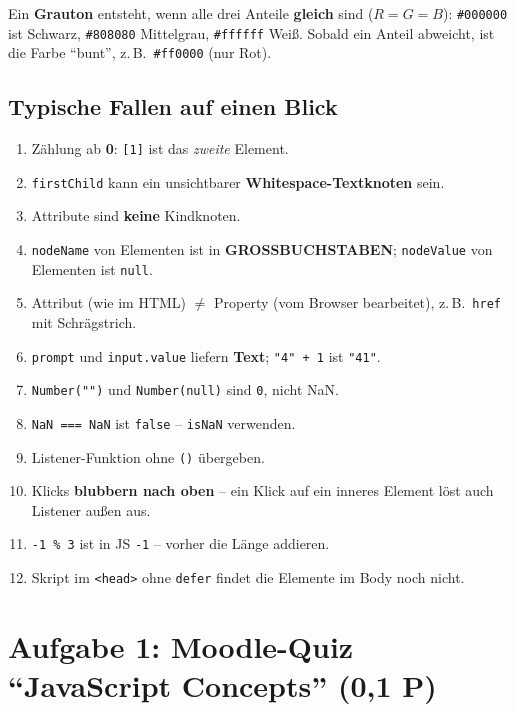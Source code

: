 \documentclass[a4paper,11pt]{article}
\begin{document}
Ein \textbf{Grauton} entsteht, wenn alle drei Anteile \textbf{gleich} sind ($R = G = B$): \texttt{\#000000} ist Schwarz,
\texttt{\#808080} Mittelgrau, \texttt{\#ffffff} Weiß. Sobald ein Anteil abweicht, ist die Farbe "`bunt"', z.\,B.\
\texttt{\#ff0000} (nur Rot).

\subsection{Typische Fallen auf einen Blick}

\begin{merkbox}[title={Typische Fallen}]
\begin{enumerate}[nosep]
\item Zählung ab \textbf{0}: \texttt{[1]} ist das \emph{zweite} Element.
\item \texttt{firstChild} kann ein unsichtbarer \textbf{Whitespace-Textknoten} sein.
\item Attribute sind \textbf{keine} Kindknoten.
\item \texttt{nodeName} von Elementen ist in \textbf{GROSSBUCHSTABEN}; \texttt{nodeValue} von Elementen ist \texttt{null}.
\item Attribut (wie im HTML) $\neq$ Property (vom Browser bearbeitet), z.\,B.\ \texttt{href} mit Schrägstrich.
\item \texttt{prompt} und \texttt{input.value} liefern \textbf{Text}; \lstinline|"4" + 1| ist \lstinline|"41"|.
\item \lstinline|Number("")| und \lstinline|Number(null)| sind \lstinline|0|, nicht NaN.
\item \lstinline|NaN === NaN| ist \lstinline|false| -- \lstinline|isNaN| verwenden.
\item Listener-Funktion ohne \texttt{()} übergeben.
\item Klicks \textbf{blubbern nach oben} -- ein Klick auf ein inneres Element löst auch Listener außen aus.
\item \lstinline|-1 % 3| ist in JS \lstinline|-1| -- vorher die Länge addieren.
\item Skript im \texttt{<head>} ohne \texttt{defer} findet die Elemente im Body noch nicht.
\end{enumerate}
\end{merkbox}

\section{Aufgabe 1: Moodle-Quiz "`JavaScript Concepts"' (0,1 P)}\label{sec:a1}
\end{document}
